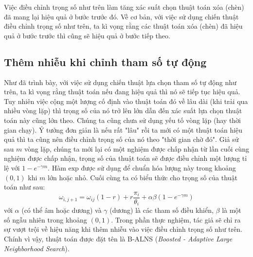 Việc điều chỉnh trọng số như trên làm tăng xác suất chọn thuật toán xóa (chèn) đã mang lại hiệu quả ở bước trước đó. Về cơ bản, với việc sử dụng chiến thuật điều chỉnh trọng số như trên, ta kì vọng rằng các thuật toán xóa (chèn) đã hiệu quả ở bước trước thì cũng sẽ hiệu quả ở bước tiếp theo. 

\subsection{Thêm nhiễu khi chỉnh tham số tự động}
Như đã trình bày, với việc sử dụng chiến thuật lựa chọn tham số tự động như trên, ta kì vọng rằng thuật toán nếu đang hiệu quả thì nó sẽ tiếp tục hiệu quả. Tuy nhiên việc cộng một lượng cố định vào thuật toán đó về lâu dài (khi trải qua nhiều vòng lặp) thì trọng số của nó trở lên lớn dẫn đến xác suất lựa chọn thuật toán này cũng lớn theo. Chúng ta cũng chưa sử dụng yếu tố vòng lặp (hay thời gian chạy). Ý tưởng đơn giản là nếu rất "lâu" rồi ta mới có một thuật toán hiệu quả thì ta cũng nên điều chỉnh trọng số của nó theo "thời gian chờ đó". Giả sử sau $m$ vòng lặp, chúng ta mới lại có một nghiệm được chấp nhận từ lần cuối cùng nghiệm được chấp nhận, trọng số của thuật toán sẽ được điều chỉnh một lượng tỉ lệ với $1 - e^{-\gamma m}$. Hàm $\text{exp}$ được sử dụng để chuẩn hóa lượng này trong khoảng $(0,1)$ khi $m$ lớn hoặc nhỏ. Cuối cùng ta có biểu thức cho trọng số của thuật toán như sau:
\begin{equation}
  \label{eq:boost_adaptive_weight}
  \omega_{i, j+1} = \omega_{ij}(1-r)+r\frac{\pi_i} {\theta_i} + \alpha \beta (1 - e^{-\gamma m})
\end{equation}
với $\alpha$ (có thể âm hoặc dương) và $\gamma$ (dương) là các tham số điều khiển, $\beta$ là một số ngẫu nhiên trong khoảng $(0,1)$. Trong phần thực nghiệm, tác giả sẽ chỉ ra sự vượt trội về hiệu năng khi thêm nhiễu vào việc điều chỉnh trọng số như trên. Chính vì vậy, thuật toán được đặt tên là B-ALNS (\textit{Boosted - Adaptive Large Neighborhood Search}).
